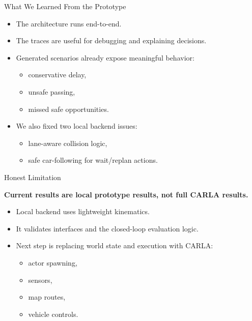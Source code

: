 \documentclass[aspectratio=169,11pt]{beamer}
\begin{document}
\begin{frame}{What We Learned From the Prototype}
\begin{itemize}
\item The architecture runs end-to-end.
\item The traces are useful for debugging and explaining decisions.
\item Generated scenarios already expose meaningful behavior:
\begin{itemize}
\item conservative delay,
\item unsafe passing,
\item missed safe opportunities.
\end{itemize}

\pause

\item We also fixed two local backend issues:
\begin{itemize}
\item lane-aware collision logic,
\item safe car-following for wait/replan actions.
\end{itemize}
\end{itemize}
\end{frame}

\begin{frame}{Honest Limitation}
\begin{center}
\Large
\textbf{Current results are local prototype results, not full CARLA results.}
\end{center}

\vspace{14pt}

\begin{itemize}
\item Local backend uses lightweight kinematics.
\item It validates interfaces and the closed-loop evaluation logic.
\item Next step is replacing world state and execution with CARLA:
\begin{itemize}
\item actor spawning,
\item sensors,
\item map routes,
\item vehicle controls.
\end{itemize}
\end{itemize}
\end{frame}
\end{document}

